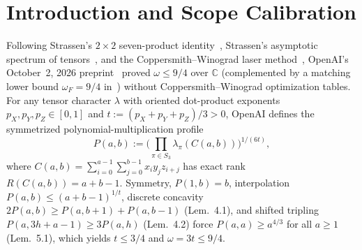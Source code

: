 \documentclass[10pt,twocolumn]{article}
\begin{document}
\section{Introduction and Scope Calibration}\label{sec:intro}
Following Strassen's $2\times 2$ seven-product identity~\cite{strassen1969gaussian}, Strassen's asymptotic spectrum of tensors~\cite{strassen1988asymptotic}, and the Coppersmith--Winograd laser method~\cite{coppersmith1990matrix}, OpenAI's October~2, 2026 preprint~\cite{openai2026omega94upper} proved $\omega \le 9/4$ over $\mathbb{C}$ (complemented by a matching lower bound $\omega_F = 9/4$ in~\cite{openai2026omega94exact}) without Coppersmith--Winograd optimization tables. For any tensor character $\lambda$ with oriented dot-product exponents $p_X,p_Y,p_Z\in[0,1]$ and $t := (p_X+p_Y+p_Z)/3 > 0$, OpenAI defines the symmetrized polynomial-multiplication profile
\begin{equation}
P(a,b) := \Bigg(\prod_{\pi\in S_3} \lambda_\pi(C(a,b))\Bigg)^{\!1/(6t)},
\label{eq:profile}
\end{equation}
where $C(a,b)=\sum_{i=0}^{a-1}\sum_{j=0}^{b-1} x_i y_j z_{i+j}$ has exact rank $R(C(a,b))=a+b-1$. Symmetry, $P(1,b)=b$, interpolation $P(a,b)\le (a+b-1)^{1/t}$, discrete concavity $2P(a,b)\ge P(a,b+1)+P(a,b-1)$ (Lem.~4.1), and shifted tripling $P(a,3h+a-1)\ge 3P(a,h)$ (Lem.~4.2) force $P(a,a)\ge a^{4/3}$ for all $a\ge 1$ (Lem.~5.1), which yields $t\le 3/4$ and $\omega = 3t \le 9/4$.
\end{document}
